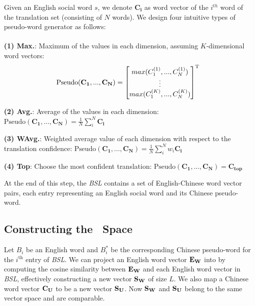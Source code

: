 Given an English social word $s$, we denote $\mathbf{C_i}$ as 
word vector of the $i^{th}$ word of the translation set (consisting of $N$ words).
We design four intuitive types of pseudo-word generator as follows:
~\\~\\
\textbf{(1) Max.}: Maximum of the values in each dimension, assuming $K$-dimensional word vectors:
\vspace{-10pt}
{\small \begin{equation*}
	\text{Pseudo}(\mathbf{C_1},...,\mathbf{C_N}) = \begin{bmatrix}
	max(C_1^{(1)},...,C_N^{(1)}) \\
	\vdots   \\
	max(C_1^{(K)},...,C_N^{(K)})
	\end{bmatrix}^{\rm T} \\
\end{equation*}}

\noindent
\textbf{(2) Avg.}: Average of the values in each dimension:
{\footnotesize $
	\text{Pseudo}(\mathbf{C_1},...,\mathbf{C_N})=\frac{1}{N}\sum_i^N\mathbf{C_i} \
$}

\noindent
\textbf{(3) WAvg.}: Weighted average value of each dimension 
with respect to the translation confidence:
{\footnotesize $
	\text{Pseudo}(\mathbf{C_1},...,\mathbf{C_N})=\frac{1}{N}\sum_i^Nw_i \mathbf{C_i} \
$}

\noindent
\textbf{(4) Top}: Choose the most confident translation:
{\footnotesize $
	\text{Pseudo}(\mathbf{C_1},...,\mathbf{C_N}) = \mathbf{C_{top}}
$}

At the end of this step, the \textit{BSL} contains a set of English-Chinese word vector pairs, each entry representing an English social word and its Chinese pseudo-word.


\subsection{Constructing the {\socvec}~Space}
\label{sec:pg}

Let $B_i$ be an English word and $B_i^*$ be
the corresponding Chinese pseudo-word for the $i^\text{th}$ entry of \textit{BSL}.  
We can project an English word vector $\bf{E_W}$ into \textit{\socvec} by 
computing the cosine similarity between $\bf{E_W}$ and each English
word vector in \textit{BSL}, effectively constructing a new vector
$\bf{S_W}$ of size $L$. 
We also map a Chinese word vector 
$\bf{C_U}$ to be a new vector $\bf{S_U}$. 
Now $\bf{S_W}$ and $\bf{S_U}$ belong to the same vector space \textit{\socvec} 
and are comparable. 

